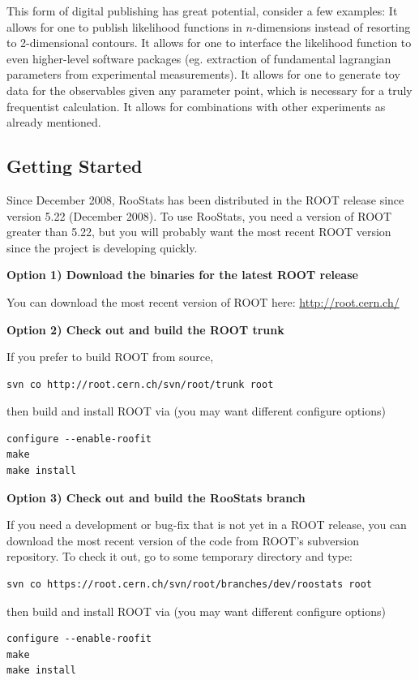 \documentclass[11pt]{article}
\begin{document}
This form of digital publishing has great potential, consider a few examples: It allows for one to publish likelihood functions in $n$-dimensions instead of resorting to 2-dimensional contours.  It allows for one to interface the likelihood function to even higher-level software packages (eg. extraction of fundamental lagrangian parameters from experimental measurements).  It allows for one to generate toy data for the observables given any parameter point, which is necessary for a truly frequentist calculation.  It allows for combinations with other experiments as already mentioned.

\subsection{Getting Started}

Since December 2008, RooStats has been distributed in the ROOT release since version 5.22 (December 2008).  To use RooStats, you need a version of ROOT greater than 5.22, but you will probably want the most recent ROOT version since the project is developing quickly.  

{\flushleft \textbf{Option 1) Download the binaries for the latest ROOT release}}

You can download the most recent version of ROOT here: \url{http://root.cern.ch/}

{\flushleft \textbf{Option 2) Check out and build the ROOT trunk}}

If you prefer to build ROOT from source, 
\begin{lstlisting}[backgroundcolor=\color{shellcommand}]
svn co http://root.cern.ch/svn/root/trunk root
\end{lstlisting}
then build and install ROOT via (you may want different configure options)
\begin{lstlisting}[backgroundcolor=\color{shellcommand}]
configure --enable-roofit
make
make install 
\end{lstlisting}


{\flushleft \textbf{Option 3) Check out and build the RooStats branch}}

If you need a development or bug-fix that is not yet in a ROOT release, you can download the most recent version of the code from ROOT's subversion repository.  To check it out, go to some temporary directory and type:
\begin{lstlisting}[backgroundcolor=\color{shellcommand}]
 svn co https://root.cern.ch/svn/root/branches/dev/roostats root
\end{lstlisting}
then build and install ROOT via (you may want different configure options)
\begin{lstlisting}[backgroundcolor=\color{shellcommand}]
configure --enable-roofit
make
make install 
\end{lstlisting}
\end{document}
